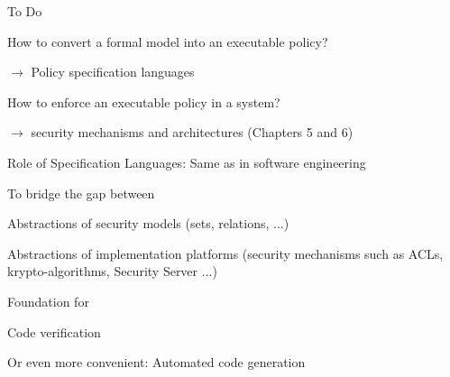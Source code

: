 \documentclass[a4paper]{article}
\begin{document}
\begin{multicols}{3}
    To Do
    \begin{itemize*}
        \item How to convert a formal model into an executable policy?
              \begin{itemize*}
                  \item $\rightarrow$  Policy specification languages
              \end{itemize*}
        \item How to enforce an executable policy in a system?
              \begin{itemize*}
                  \item $\rightarrow$  security mechanisms and architectures (Chapters 5 and 6)
              \end{itemize*}
    \end{itemize*}

    Role of Specification Languages: Same as in software engineering
    \begin{itemize*}
        \item To bridge the gap between
              \begin{itemize*}
                  \item Abstractions of security models (sets, relations, ...)
                  \item Abstractions of implementation platforms (security mechanisms such as ACLs, krypto-algorithms, Security Server ...)
              \end{itemize*}
        \item Foundation for
              \begin{itemize*}
                  \item Code verification
                  \item Or even more convenient: Automated code generation
              \end{itemize*}
    \end{itemize*}



\end{multicols}
\end{document}
